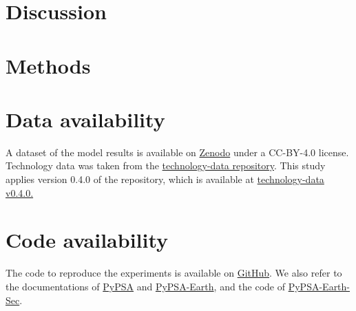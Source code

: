 \documentclass[5p,numafflabel]{elsarticle}
\begin{document}


\section*{Discussion}
\label{sec:discussion}



\label{sec:conclusion}



\section*{Methods}
\label{sec:methods}













\section*{Data availability}
A dataset of the model results is available on \href{https://doi.org/10.5281/zenodo.10951650}{Zenodo} under a CC-BY-4.0 license. 
Technology data was taken from the \href{https://github.com/pypsa/technology-data}{technology-data repository}. This study applies version 0.4.0 of the repository, which is available at \href{https://github.com/PyPSA/technology-data/blob/v0.4.0/outputs/costs_2030.csv}{technology-data v0.4.0.}

\section*{Code availability}
The code to reproduce the experiments is available on \href{https://github.com/energyLS/aldehyde}{GitHub}.
We also refer to the documentations of \href{https://pypsa.readthedocs.io}{PyPSA} and  \href{https://pypsa-earth.readthedocs.io}{PyPSA-Earth}, and the code of 
\href{https://github.com/pypsa-meets-earth/pypsa-earth-sec}{PyPSA-Earth-Sec}.
\end{document}
